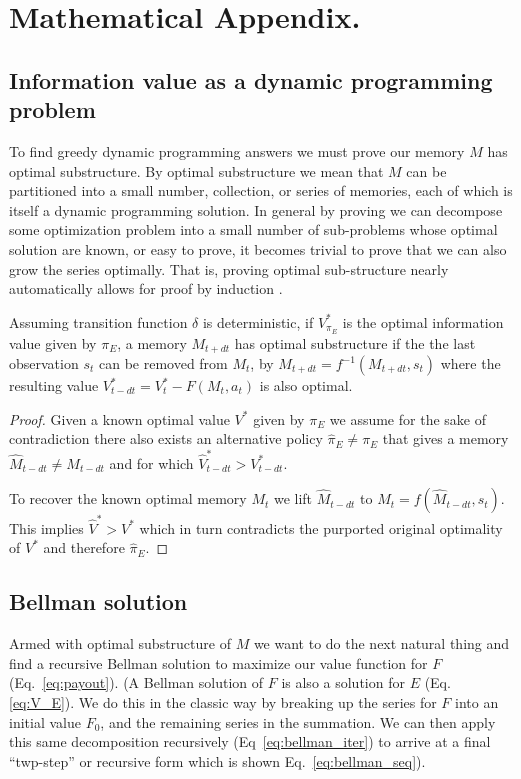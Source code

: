 \section*{Mathematical Appendix.}
\subsection*{Information value as a dynamic programming problem} To find greedy dynamic programming \cite{Roughgarden2019,Sutton2018} answers we must prove our memory $M$ has optimal substructure. By optimal substructure we mean that $M$ can be partitioned into a small number, collection, or series of memories, each of which is itself a dynamic programming solution. In general by proving we can decompose some optimization problem into a small number of sub-problems whose optimal solution are known, or easy to prove, it becomes trivial to prove that we can also grow the series optimally. That is, proving optimal sub-structure nearly automatically allows for proof by induction \cite{Roughgarden2019}. 

\begin{theorem} \label{theorem:opt_sub} 
	Assuming transition function $\delta$ is deterministic, if $V^*_{\pi_E}$ is the optimal information value given by $\pi_E$, a memory $M_{t+dt}$ has optimal substructure if the the last observation $s_t$ can be removed from $M_t$, by $M_{t+dt} = f^{-1}(M_{t+dt}, s_t)$ where the resulting value $V^*_{t-dt} = V^*_{t} - F(M_t, a_t)$ is also optimal. 
\end{theorem}
\begin{proof}
	Given a known optimal value $V^*$ given by $\pi_E$ we assume for the sake of contradiction there also exists an alternative policy $\hat \pi_E \neq \pi_E$ that gives a memory $\hat M_{t-dt} \neq M_{t-dt}$ and for which $\hat V^*_{t-dt} > V^*_{t-dt}$. 
	
	To recover the known optimal memory $M_t$ we lift $\hat M_{t-dt}$ to $M_t = f(\hat M_{t-dt}, s_t)$. This implies $\hat V^* > V^*$ which in turn contradicts the purported original optimality of $V^*$ and therefore $\hat \pi_E$.
\end{proof}

\subsection*{Bellman solution} Armed with optimal substructure of $M$ we want to do the next natural thing and find a recursive Bellman solution to maximize our value function for $F$ (Eq.~\ref{eq:payout}). (A Bellman solution of $F$ is also a solution for $E$ (Eq.\ref{eq:V_E}). We do this in the classic way by breaking up the series for $F$ into an initial value $F_0$, and the remaining series in the summation. We can then apply this same decomposition recursively (Eq~\ref{eq:bellman_iter}) to arrive at a final ``twp-step'' or recursive form which is shown Eq.~\ref{eq:bellman_seq}). 

